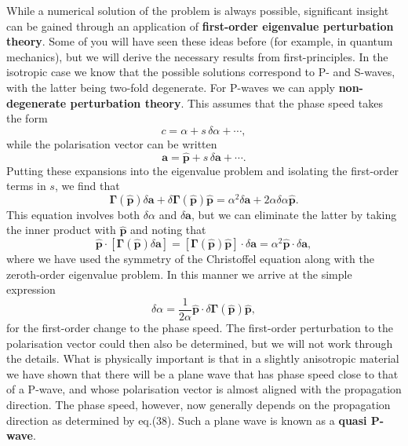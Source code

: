 \documentclass [a4paper,12pt]{paper}
\begin{document}
While a numerical solution of the problem is always possible, significant insight 
can be gained through an application of \textbf{first-order eigenvalue perturbation theory}. Some of you will have seen these 
ideas before (for example, in quantum mechanics), but we will derive the necessary results from first-principles. 
In the isotropic case we know that the possible solutions correspond to P- and S-waves, with the latter being two-fold degenerate. 
For P-waves we can apply \textbf{non-degenerate perturbation theory}. This assumes that the phase speed takes the form
\begin{equation}
c=\alpha+s\,\delta\alpha+\cdots,
\end{equation}
while the polarisation vector can be written
\begin{equation}
\mathbf{a}=\hat{\mathbf{p}}+s\,\delta \mathbf{a}+\cdots.
\end{equation}
Putting these expansions into the eigenvalue problem and isolating the first-order terms in $s$, we find that
\begin{equation}
\bm{\Gamma}(\hat{\mathbf{p}})\delta \mathbf{a}+\delta\bm{\Gamma}(\hat{\mathbf{p}})\hat{\mathbf{p}}=\alpha^{2}\delta 
\mathbf{a}+2\alpha\delta\alpha\hat{\mathbf{p}}.
\end{equation}
This equation involves both $\delta\alpha$ and $\delta \mathbf{a}$, but we can eliminate the latter by taking the inner product 
with $\hat{\mathbf{p}}$ and noting that
\begin{equation}
\hat{\mathbf{p}}\cdot[\bm{\Gamma}(\hat{\mathbf{p}})\delta \mathbf{a}]=[\bm{\Gamma}(\hat{\mathbf{p}})\hat{\mathbf{p}}]\cdot\delta
 \mathbf{a}=\alpha^{2}\hat{\mathbf{p}}\cdot\delta \mathbf{a}, 
\end{equation}
where we have used the symmetry of the Christoffel equation along with the zeroth-order eigenvalue problem. In this manner we 
arrive at the simple expression
\begin{equation}
\delta\alpha=\frac{1}{2\alpha}\hat{\mathbf{p}}\cdot\delta\bm{\Gamma}(\hat{\mathbf{p}})\hat{\mathbf{p}}, 
\end{equation}
for the first-order change to the phase speed. The first-order perturbation to the polarisation vector could then also be determined, 
but we will not work through the details. What is physically important is that in a slightly anisotropic material 
we have shown that there will be a plane wave that has phase speed close to that of a P-wave, and whose polarisation vector is 
almost aligned with the propagation direction. The phase speed, however,  now generally depends on the propagation direction as determined 
by eq.(38). Such a plane wave is known as a \textbf{quasi P-wave}.
\end{document}
